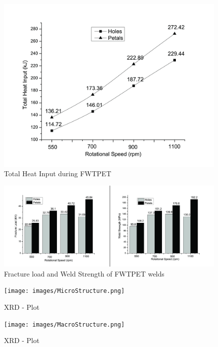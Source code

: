 \documentclass[3p]{elsarticle}
\begin{document}
\begin{figure}[H]
\centering
\includegraphics[width=\textwidth,keepaspectratio]{images/Total HI.jpg}
\caption{Total Heat Input during FWTPET}
\label{fig:total-heat-input}
\end{figure}

\begin{figure}[H]
\centering
\includegraphics[width=\textwidth,keepaspectratio]{images/Strength.jpg}
\caption{Fracture load and Weld Strength of FWTPET welds}
\label{fig:weld-strength}
\end{figure}

\begin{figure}[!htbp]
\centering
\texttt{[image: images/MicroStructure.png]}
\caption{XRD - Plot}
\label{fig:xrd-plot}
\end{figure}

\begin{figure}[!htbp]
\centering
\texttt{[image: images/MacroStructure.png]}
\caption{XRD - Plot}
\label{fig:xrd-plot}
\end{figure}
\end{document}
